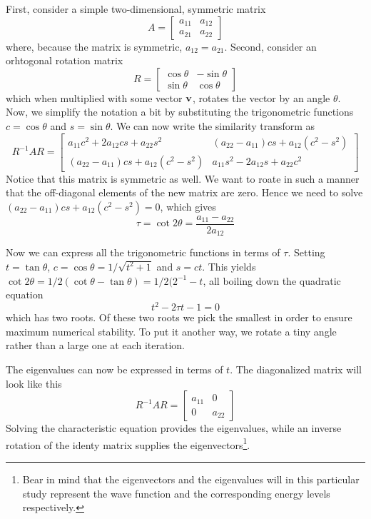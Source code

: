 \documentclass[10pt, a4paper]{amsart}
\begin{document}
First, consider a simple two-dimensional, symmetric matrix
\begin{equation}
A = \begin{bmatrix}
a_{11} & a_{12} \\
a_{21} & a_{22}
\end{bmatrix}
\end{equation}
where, because the matrix is symmetric, $a_{12}=a_{21}$. Second, consider an orhtogonal rotation matrix
\begin{equation}
R = \begin{bmatrix}
\cos{\theta} & -\sin{\theta} \\
\sin{\theta} & \cos{\theta}
\end{bmatrix}
\end{equation}
which when multiplied with some vector $\vb{v}$, rotates the vector by an angle $\theta$. Now, we simplify the notation a bit by substituting the trigonometric functions $c=\cos{\theta}$ and $s=\sin{\theta}$. We can now write the similarity transform as
\begin{equation}
R^{-1}AR=\begin{bmatrix}
a_{11}c^2+2a_{12}cs + a_{22}s^2 & (a_{22}-a_{11})cs+a_{12}(c^2-s^2) \\
(a_{22}-a_{11})cs + a_{12}(c^2-s^2) & a_{11}s^2-2a_{12}s+a_{22}c^2
\end{bmatrix}
\end{equation}
Notice that this matrix is symmetric as well. We want to roate in such a manner that the off-diagonal elements of the new matrix are zero. Hence we need to solve $(a_{22}-a_{11})cs + a_{12}(c^2-s^2)=0$, which gives
\begin{equation}
\tau = \cot{2\theta} = \frac{a_{11}-a_{22}}{2a_{12}}
\end{equation}

Now we can express all the trigonometric functions in terms of $\tau$. Setting $t = \tan{\theta}$, $c=\cos{\theta}=1/\sqrt{t^2+1}$ and $s=ct$. This yields $\cot{2\theta}=1/2(\cot{\theta}-\tan{\theta}) = 1/2(2^{-1}-t$, all boiling down the quadratic equation
\begin{equation}
t^2-2\tau t-1 =0
\end{equation}
which has two roots. Of these two roots we pick the smallest in order to ensure maximum  numerical stability. To put it another way, we rotate a tiny angle rather than a large one at each iteration.

The eigenvalues can now be expressed in terms of $t$. The diagonalized matrix will look like this
\begin{equation}
R^{-1}AR = \begin{bmatrix}
a_{11} & 0 \\
0 & a_{22}
\end{bmatrix}
\end{equation}
Solving the characteristic equation provides the eigenvalues, while an inverse rotation of the identy matrix supplies the eigenvectors\footnote{Bear in mind that the eigenvectors and the eigenvalues will in this particular study represent the wave function and the corresponding energy levels respectively.}.
\end{document}
